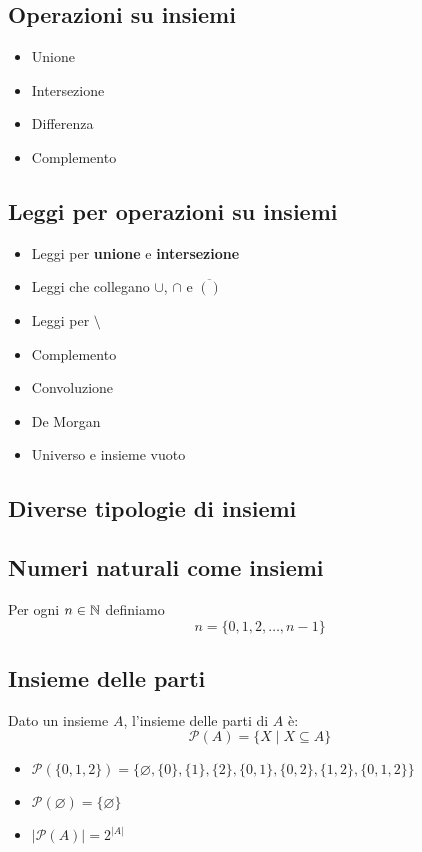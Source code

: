 \documentclass{article}
\begin{document}
\subsection{Operazioni su insiemi}
\begin{itemize}
    \item Unione
    \item Intersezione
    \item Differenza
    \item Complemento
\end{itemize}
\subsection*{Leggi per operazioni su insiemi}
\begin{itemize}
    \item Leggi per \textbf{unione} e \textbf{intersezione}
    \item Leggi che collegano \(\cup\), \(\cap\) e \(\overline{()}\)
    \item Leggi per \(\setminus\)
    \item Complemento
    \item Convoluzione
    \item De Morgan
    \item Universo e insieme vuoto
\end{itemize}

\subsection{Diverse tipologie di insiemi}
\subsection*{Numeri naturali come insiemi}
Per ogni \(n \in \mathbb{N}\) definiamo
\[n = \{0,1,2,\ldots, n - 1\}\]
\subsection*{Insieme delle parti}
Dato un insieme \(A\), l'insieme delle parti di \(A\) è:
\[\mathcal{P}(A) = \{X \mid X \subseteq A\}\]
\begin{itemize}
    \item \(\mathcal{P}(\{0,1,2\}) = \{\varnothing, \{0\}, \{1\}, \{2\}, \{0,1\}, \{0,2\}, \{1,2\}, \{0,1,2\}\}\)
    \item \(\mathcal{P}(\varnothing) = \{\varnothing\}\)
    \item \(\lvert\mathcal{P}(A)\rvert = 2^{\lvert A \rvert}\)
\end{itemize}
\end{document}
